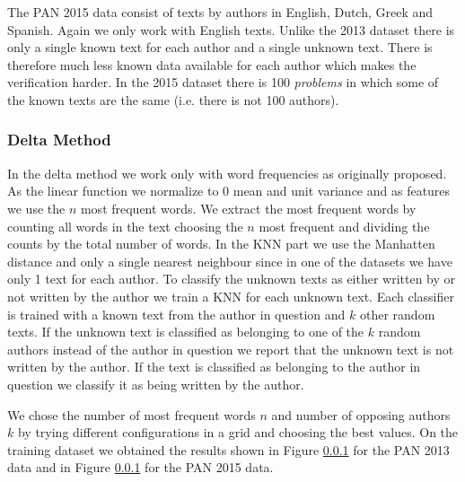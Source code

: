 The PAN 2015 data consist of texts by authors in English, Dutch, Greek and
Spanish. Again we only work with English texts. Unlike the 2013 dataset there is
only a single known text for each author and a single unknown text. There is
therefore much less known data available for each author which makes the
verification harder. In the 2015 dataset there is 100 \textit{problems} in which
some of the known texts are the same (i.e. there is not 100 authors).

\subsubsection{Delta Method}
In the delta method we work only with word frequencies as originally proposed.
As the linear function we normalize to 0 mean and unit variance and as features
we use the $n$ most frequent words. We extract the most frequent words by
counting all words in the text choosing the $n$ most frequent and dividing the
counts by the total number of words. In the \gls{KNN} part we use the Manhatten
distance and only a single nearest neighbour since in one of the datasets we
have only 1 text for each author. To classify the unknown texts as either
written by or not written by the author we train a \gls{KNN} for each unknown
text.  Each classifier is trained with a known text from the author in question
and $k$ other random texts. If the unknown text is classified as belonging
to one of the $k$ random authors instead of the author in question we report
that the unknown text is not written by the author. If the text is classified
as belonging to the author in question we classify it as being written by the
author.

We chose the number of most frequent words $n$ and number of opposing authors
$k$ by trying different configurations in a grid and choosing the best values.
On the training dataset we obtained the results shown in Figure \ref{} for the
PAN 2013 data and in Figure \ref{} for the PAN 2015 data.

